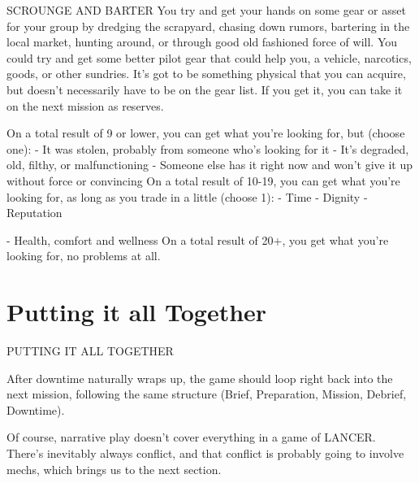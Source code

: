 SCROUNGE AND BARTER
You try and get your hands on some gear or asset for your group by dredging the scrapyard,
chasing down rumors, bartering in the local market, hunting around, or through good old
fashioned force of will. You could try and get some better pilot gear that could help you, a vehicle,
narcotics, goods, or other sundries. It’s got to be something physical that you can acquire, but
doesn’t necessarily have to be on the gear list. If you get it, you can take it on the next mission as
reserves.

On a total result of 9 or lower, you can get what you’re looking for, but (choose one):
    -    It was stolen, probably from someone who’s looking for it
    -    It’s degraded, old, filthy, or malfunctioning
    -    Someone else has it right now and won’t give it up without force or convincing
On a total result of 10-19, you can get what you’re looking for, as long as you trade in a little
(choose 1):
    -    Time
    -    Dignity
    -    Reputation




     -   Health, comfort and wellness
On a total result of 20+, you get what you’re looking for, no problems at all.

\section{Putting it all Together}
                                    PUTTING IT ALL TOGETHER

After downtime naturally wraps up, the game should loop right back into the next mission,
following the same structure (Brief, Preparation, Mission, Debrief, Downtime).

Of course, narrative play doesn’t cover everything in a game of LANCER. There’s inevitably
always conflict, and that conflict is probably going to involve mechs, which brings us to the next
section.
